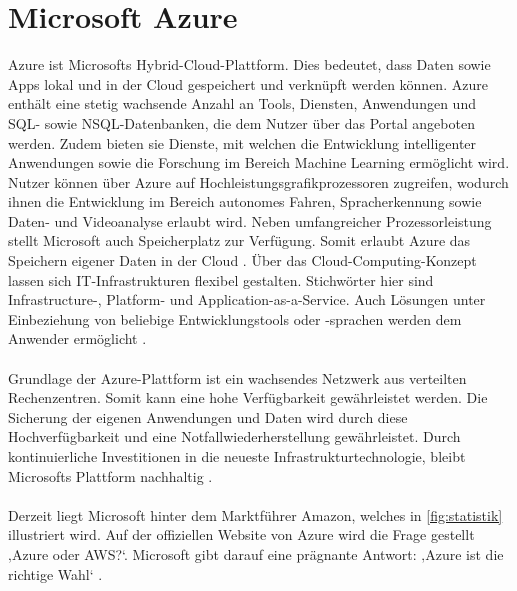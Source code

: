 \section{Microsoft Azure}
Azure ist Microsofts Hybrid-Cloud-Plattform. Dies bedeutet, dass Daten sowie Apps lokal und in der Cloud gespeichert und verknüpft werden können. Azure enthält eine stetig wachsende Anzahl an Tools, Diensten, Anwendungen und SQL- sowie NSQL-Datenbanken, die dem Nutzer über das Portal angeboten werden. Zudem bieten sie Dienste, mit welchen die Entwicklung intelligenter Anwendungen sowie die Forschung im Bereich Machine Learning ermöglicht wird. Nutzer können über Azure auf Hochleistungsgrafikprozessoren zugreifen, wodurch ihnen die Entwicklung im Bereich autonomes Fahren, Spracherkennung sowie Daten- und Videoanalyse erlaubt wird. Neben umfangreicher Prozessorleistung stellt Microsoft auch Speicherplatz zur Verfügung. Somit erlaubt Azure das Speichern eigener Daten in der Cloud \cite{Sicherheit.2017b}. Über das Cloud-Computing-Konzept lassen sich IT-Infrastrukturen flexibel gestalten. Stichwörter hier sind Infrastructure-, Platform- und Application-as-a-Service. Auch Lösungen unter Einbeziehung von beliebige Entwicklungstools oder -sprachen werden dem Anwender ermöglicht \cite{Klein.2017}. \\ \\ 
Grundlage der Azure-Plattform ist ein wachsendes Netzwerk aus verteilten Rechenzentren. Somit kann eine hohe Verfügbarkeit gewährleistet werden. Die Sicherung der eigenen Anwendungen und Daten wird durch diese Hochverfügbarkeit und eine Notfallwiederherstellung gewährleistet. Durch kontinuierliche Investitionen in die neueste Infrastrukturtechnologie, bleibt Microsofts Plattform nachhaltig \cite{Klein.2017}.\\ \\
Derzeit liegt Microsoft hinter dem Marktführer Amazon, welches in \ref{fig:statistik} illustriert wird. Auf der offiziellen Website von Azure wird die Frage gestellt ‚Azure oder AWS?‘. Microsoft gibt darauf eine prägnante Antwort: ‚Azure ist die richtige Wahl‘ \cite{Microsoft.2017}.
